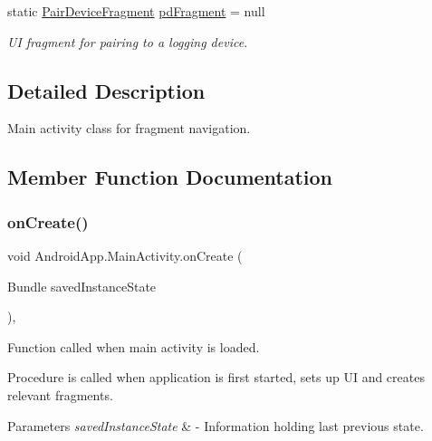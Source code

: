 \begin{DoxyCompactItemize}
\mbox{\label{class_android_app_1_1_main_activity_a6dea684256a0cd0f73f87546ec2b0de2}} 
static \hyperlink{class_android_app_1_1_pair_device_fragment}{Pair\+Device\+Fragment} \hyperlink{class_android_app_1_1_main_activity_a6dea684256a0cd0f73f87546ec2b0de2}{pd\+Fragment} = null
\begin{DoxyCompactList}\small\item\em UI fragment for pairing to a logging device. \end{DoxyCompactList}\end{DoxyCompactItemize}


\subsection{Detailed Description}
Main activity class for fragment navigation. 

\subsection{Member Function Documentation}
\mbox{\label{class_android_app_1_1_main_activity_a2b1390dea8035d3802067ceb6ba5ebbd}} 
\subsubsection{\texorpdfstring{on\+Create()}{onCreate()}}
{\footnotesize\ttfamily void Android\+App.\+Main\+Activity.\+on\+Create (\begin{DoxyParamCaption}\item[{Bundle}]{saved\+Instance\+State }\end{DoxyParamCaption})\hspace{0.3cm}{\ttfamily [inline]}, {\ttfamily [protected]}}



Function called when main activity is loaded. 

Procedure is called when application is first started, sets up UI and creates relevant fragments.


\begin{DoxyParams}{Parameters}
{\em saved\+Instance\+State} & -\/ Information holding last previous state. \\
\hline
\end{DoxyParams}

